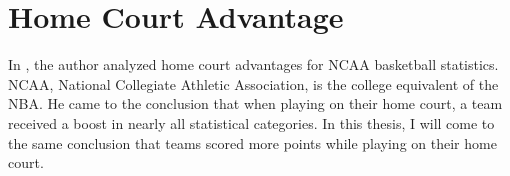 \section{Home Court Advantage}

\noindent In \cite{homecourtadv}, the author analyzed home court advantages for NCAA basketball statistics. NCAA, National Collegiate Athletic Association, is the college equivalent of the NBA. He came to the conclusion that when playing on their home court, a team received a boost in nearly all statistical categories. In this thesis, I will come to the same conclusion that teams scored more points while playing on their home court.

